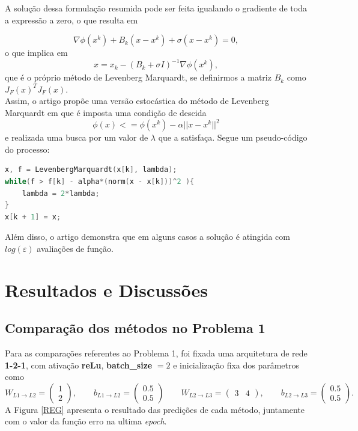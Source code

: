 \documentclass[11pt]{article}
\begin{document}
A solução dessa formulação resumida pode ser feita igualando o gradiente de toda a expressão a zero, o que resulta em 

$$\nabla \phi(x^k) + B_k (x - x^k) + \sigma(x - x^k) = 0, $$ 
o que implica em 
$$x = x_k - (B_k + \sigma I)^{-1} \nabla \phi(x^k), $$ que é o próprio método de Levenberg Marquardt, se definirmos a matriz $B_k$ como $J_{F}(x)^T J_{F}(x)$.\\ 

Assim, o artigo propõe uma versão estocástica do método de Levenberg Marquardt em que é imposta uma condição de descida
$$\phi(x) <= \phi(x^k) - \alpha ||x - x^k||^2$$ e realizada uma busca por um valor de $\lambda$ que a satisfaça. Segue um pseudo-código do processo:

\begin{lstlisting}[language=C, caption=Levenberg Marquardt com busca linear]
x, f = LevenbergMarquardt(x[k], lambda);
while(f > f[k] - alpha*(norm(x - x[k]))^2 ){
	lambda = 2*lambda;
}
x[k + 1] = x;
\end{lstlisting}

Além disso, o artigo demonstra\cite{bmLS} que em alguns casos a solução é atingida com $log (\varepsilon)$ avaliações de função.
\newpage
\section{Resultados e Discussões}
\subsection*{Comparação dos métodos no Problema 1}
Para as comparações referentes ao Problema 1, foi fixada uma arquitetura de rede \textbf{1-2-1}, com ativação \textbf{reLu}, \textbf{batch\_size} $ = 2$ e inicialização fixa dos parâmetros como 
$$W_{L1\rightarrow L2} = \begin{pmatrix} 1 \\ 2\end{pmatrix}, \qquad b_{L1\rightarrow L2} = \begin{pmatrix} 0.5 \\ 0.5\end{pmatrix}\qquad W_{L2\rightarrow L3} = \begin{pmatrix} 3 & 4\end{pmatrix}, \qquad b_{L2\rightarrow L3} = \begin{pmatrix} 0.5 \\ 0.5\end{pmatrix}.$$ 
A Figura \ref{REG} apresenta o resultado das predições de cada método, juntamente com o valor da função erro na ultima \textit{epoch}.
\end{document}
